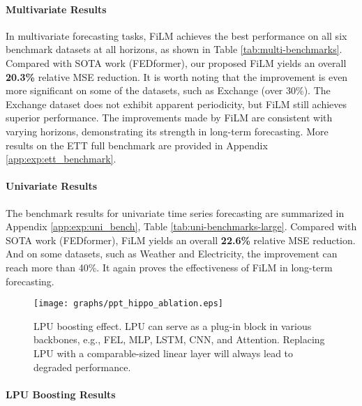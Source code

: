 \documentclass{article}
\begin{document}
\paragraph{Multivariate Results}
In multivariate forecasting tasks,
FiLM achieves the best performance on all six benchmark datasets at all horizons, as shown in Table \ref{tab:multi-benchmarks}. Compared with SOTA work (FEDformer), our proposed FiLM yields an overall \textbf{20.3\%} relative MSE reduction. It is worth noting that the improvement is even more significant on some of the datasets, such as Exchange (over 30\%). The Exchange dataset does not exhibit apparent periodicity, but FiLM still achieves superior performance.  
The improvements made by FiLM are consistent with varying horizons, demonstrating
its strength in long-term forecasting. More results
on the ETT full benchmark are provided in Appendix \ref{app:exp:ett_benchmark}.



\paragraph{Univariate Results}
The benchmark results for univariate time series
forecasting are summarized in Appendix \ref{app:exp:uni_bench}, Table \ref{tab:uni-benchmarks-large}. Compared with
SOTA work (FEDformer), FiLM yields an overall \textbf{22.6\%} relative
MSE reduction. And on some datasets, such as Weather and
Electricity, the improvement can reach more than 40\%. It again
proves the effectiveness of FiLM in long-term forecasting.


\begin{figure*}[t]
\centering
\texttt{[image: graphs/ppt\_hippo\_ablation.eps]}
\caption{LPU boosting effect. LPU can serve as a plug-in block in various backbones, e.g., FEL, MLP, LSTM, CNN, and Attention. Replacing LPU with a comparable-sized linear layer will always lead to degraded performance.}
\label{fig:boost}
\vskip -0.2in
\end{figure*}


\paragraph{LPU Boosting Results}
\vskip -0.1in
\end{document}
